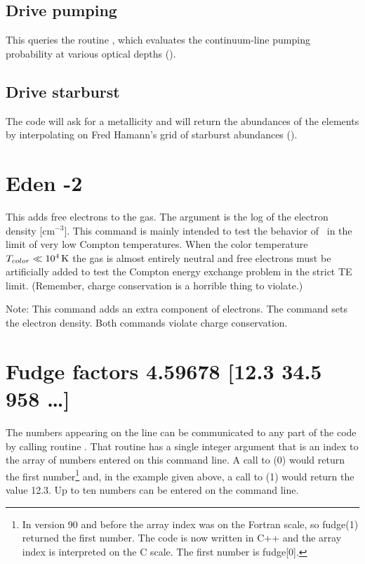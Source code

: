\subsection{Drive pumping}

This queries the routine ,
which evaluates the continuum-line
pumping probability at various optical depths (\citealp{Ferland1992}).

\subsection{Drive starburst}

The code will ask for a metallicity and will return the abundances of
the elements by interpolating on Fred Hamann's grid of
starburst abundances (\citealp{Hamann1993}).

\section{Eden -2}

This adds free electrons to the gas.
The argument is the log of the
electron density [cm$^{-3}$].
This command is mainly intended to test the
behavior of \Cloudy\ in the limit of very low Compton temperatures.
When
the color temperature $T_{color} \ll 10^4 {\rm\thinspace K}$ the gas is almost
entirely neutral
and free electrons must be artificially added to test the Compton energy
exchange problem in the strict TE limit.
(Remember, charge conservation is a horrible thing to violate.)

Note:  This command adds an extra component of electrons.
The 
command sets the electron density.
Both commands violate charge conservation.

\section{Fudge factors 4.59678 [12.3 34.5 958 \dots]}

The numbers appearing on the line can be communicated to any part of
the code by calling routine .
That routine has a single integer
argument that is an index to the array of numbers entered on this command
line.
A call to (0) would return the first number\footnote{In version 90 and before the array index was on the Fortran scale,
so fudge(1) returned the first number.  The code is now written in C++ and
the array index is interpreted on the C scale.  The first number is fudge[0].} and, in the
example given above, a call to (1) would return the value 12.3.
Up to ten numbers can be entered on the command line.

